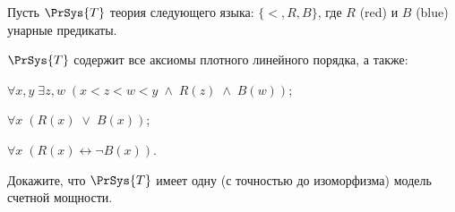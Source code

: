 Пусть $\PrSys{T}$ теория следующего языка: $\{<, R, B\}$, где $R$ (red) и $B$ (blue) унарные предикаты.
    
$\PrSys{T}$ содержит все аксиомы плотного линейного порядка, а также:
\begin{itemtask}
    \item $\forall x, y \; \exists z, w \; (x < z < w < y \; \wedge \; R(z) \; \wedge \; B(w))$;
    \item $\forall x \; (R(x)\; \vee \; B(x))$;
    \item $\forall x \; (R(x) \leftrightarrow \neg B(x))$.
\end{itemtask}
    
Докажите, что $\PrSys{T}$ имеет одну (с точностью до изоморфизма) модель счетной мощности.